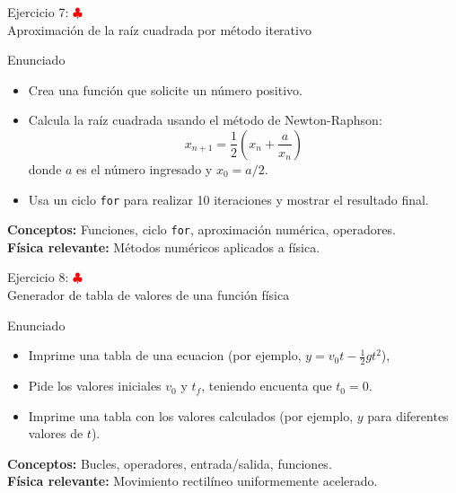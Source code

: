 \documentclass[10pt]{beamer}
\begin{document}
\begin{frame}{Ejercicio 7: \hfill \textcolor{red}{$\clubsuit$} \\ Aproximación de la raíz cuadrada por método iterativo}
  \small
  \begin{block}{Enunciado}
    \begin{itemize}
      \setlength{\itemsep}{0.35em}
      \item Crea una función que solicite un número positivo.
      \item Calcula la raíz cuadrada usando el método de Newton-Raphson:
        \[
        x_{n+1}=\frac{1}{2}\left(x_n+\frac{a}{x_n}\right)
        \]
        donde \(a\) es el número ingresado y \(x_0=a/2\).
      \item Usa un ciclo \texttt{for} para realizar 10 iteraciones y mostrar el resultado final.
    \end{itemize}
  \end{block}
  \textbf{Conceptos:} Funciones, ciclo \texttt{for}, aproximación numérica, operadores.\\
  \textbf{Física relevante:} Métodos numéricos aplicados a física.
\end{frame}



\begin{frame}{Ejercicio 8: \hfill \textcolor{red}{$\clubsuit$} \\ Generador de tabla de valores de una función física}
  \begin{block}{Enunciado}
    \begin{itemize}
      \item Imprime una tabla de una ecuacion (por ejemplo, \(y = v_0 t - \frac{1}{2}gt^2\)), 
      \item Pide los valores iniciales \(v_0\) y  \(t_f\), teniendo encuenta que \(t_0 = 0 \).
      \item Imprime una tabla con los valores calculados (por ejemplo, \(y\) para diferentes valores de \(t\)).
    \end{itemize}
  \end{block}
  \textbf{Conceptos:} Bucles, operadores, entrada/salida, funciones.\\
  \textbf{Física relevante:} Movimiento rectilíneo uniformemente acelerado.
\end{frame}
\end{document}
